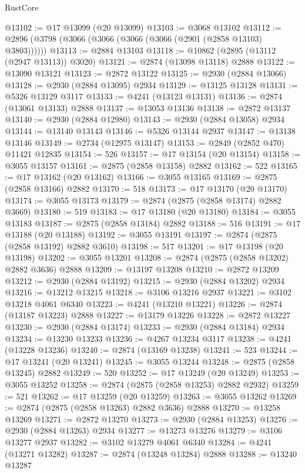 \begin{lexlean}{RustCore}
\begin{coremodule}
@13102 := @17 @13099 (@20 @13099)
@13103 := @3068 @13102
@13112 := @2896 (@3798 (@3066 (@3066 (@3066 (@3066 (@2901 (@2858 @13103) @3803))))))
@13113 := @2884 @13103
@13118 := @10862 (@2895 (@13112 (@2947 @13113)) @3020)
@13121 := @2874 (@13098 @13118) @2888
@13122 := @13090 @13121
@13123 := @2872 @13122
@13125 := @2930 (@2884 @13066)
@13128 := @2930 (@2884 @13095) @2934
@13129 := @13125 @13128
@13131 := @5326 @13129 @3117
@13133 := @4241 (@13123 @13131)
@13136 := @2874 (@13061 @13133) @2888
@13137 := @13053 @13136
@13138 := @2872 @13137
@13140 := @2930 (@2884 @12980)
@13143 := @2930 (@2884 @13058) @2934
@13144 := @13140 @13143
@13146 := @5326 @13144 @2937
@13147 := @13138 @13146
@13149 := @2734 (@12975 @13147)
@13153 := @2849 (@2852 @470) @11421 @12835
@13154 := 526
@13157 := @17 @13154 (@20 @13154)
@13158 := @3055 @13157
@13161 := @2875 (@2858 @13158) @2882
@13162 := 522
@13165 := @17 @13162 (@20 @13162)
@13166 := @3055 @13165
@13169 := @2875 (@2858 @13166) @2882
@13170 := 518
@13173 := @17 @13170 (@20 @13170)
@13174 := @3055 @13173
@13179 := @2874 (@2875 (@2858 @13174) @2882 @3669)
@13180 := 519
@13183 := @17 @13180 (@20 @13180)
@13184 := @3055 @13183
@13187 := @2875 (@2858 @13184) @2882
@13188 := 516
@13191 := @17 @13188 (@20 @13188)
@13192 := @3055 @13191
@13197 := @2874 (@2875 (@2858 @13192) @2882 @3610)
@13198 := 517
@13201 := @17 @13198 (@20 @13198)
@13202 := @3055 @13201
@13208 := @2874 (@2875 (@2858 @13202) @2882 @3636) @2888
@13209 := @13197 @13208
@13210 := @2872 @13209
@13212 := @2930 (@2884 @13192)
@13215 := @2930 (@2884 @13202) @2934
@13216 := @13212 @13215
@13218 := @3106 @13216 @2937
@13221 := @3102 @13218 @4061 @6340
@13223 := @4241 (@13210 @13221)
@13226 := @2874 (@13187 @13223) @2888
@13227 := @13179 @13226
@13228 := @2872 @13227
@13230 := @2930 (@2884 @13174)
@13233 := @2930 (@2884 @13184) @2934
@13234 := @13230 @13233
@13236 := @4267 @13234 @3117
@13238 := @4241 (@13228 @13236)
@13240 := @2874 (@13169 @13238)
@13241 := 523
@13244 := @17 @13241 (@20 @13241)
@13245 := @3055 @13244
@13248 := @2875 (@2858 @13245) @2882
@13249 := 520
@13252 := @17 @13249 (@20 @13249)
@13253 := @3055 @13252
@13258 := @2874 (@2875 (@2858 @13253) @2882 @2932)
@13259 := 521
@13262 := @17 @13259 (@20 @13259)
@13263 := @3055 @13262
@13269 := @2874 (@2875 (@2858 @13263) @2882 @3636) @2888
@13270 := @13258 @13269
@13271 := @2872 @13270
@13273 := @2930 (@2884 @13253)
@13276 := @2930 (@2884 @13263) @2934
@13277 := @13273 @13276
@13279 := @3106 @13277 @2937
@13282 := @3102 @13279 @4061 @6340
@13284 := @4241 (@13271 @13282)
@13287 := @2874 (@13248 @13284) @2888
@13288 := @13240 @13287

\end{coremodule}
\end{lexlean}
